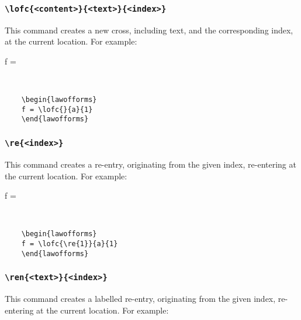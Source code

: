 \documentclass[12pt]{article}
\begin{document}
\subsubsection*{\texttt{\textbackslash lofc\{<content>\}\{<text>\}\{<index>\}}}

This command creates a new cross, including text, and the corresponding index, at the current location. For example:


\begin{minipage}[c]{.45\textwidth}
	\begin{lawofforms}
		f = 
	\end{lawofforms}
\end{minipage}~~
\begin{minipage}[c]{.5\textwidth}
	\begin{lstlisting}
	\begin{lawofforms}
	f = \lofc{}{a}{1}
	\end{lawofforms}\end{lstlisting}
\end{minipage}

\subsubsection*{\texttt{\textbackslash re\{<index>\}}}

This command creates a re-entry, originating from the given index, re-entering at the current location. For example:


\begin{minipage}[c]{.45\textwidth}
	\begin{lawofforms}
		f = 
	\end{lawofforms}
\end{minipage}~~
\begin{minipage}[c]{.5\textwidth}
	\begin{lstlisting}
	\begin{lawofforms}
	f = \lofc{\re{1}}{a}{1}
	\end{lawofforms}\end{lstlisting}
\end{minipage}

\subsubsection*{\texttt{\textbackslash ren\{<text>\}\{<index>\}}}

This command creates a labelled re-entry, originating from the given index, re-entering at the current location. For example:
\end{document}
